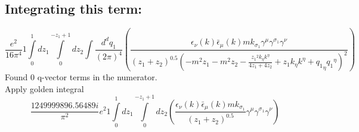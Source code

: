 \subsection*{Integrating this term:}
\begin{dmath}\frac{e^{2}}{16 \pi^{4}}1\int\limits_{ 0 }^{ 1 } d{ z_{ 1 } }\int\limits_{ 0 }^{ - { z_{ 1 } } + 1 } d{ z_{ 2 } }\int\frac{d^d q_1 }{ (2\pi)^4 }\left(\frac{\epsilon_{ \nu }({ k }) \bar{\epsilon}_{ \mu }({ k }) m { { k }_{ \sigma_1 } } { \gamma^{ \mu } } { \gamma^{ \sigma_1 } } { \gamma^{ \nu } }}{\left({ z_{ 1 } } + { z_{ 2 } }\right)^{0.5} \left(- m^{2} { z_{ 1 } } - m^{2} { z_{ 2 } } - \frac{{ z_{ 1 } }^{2} { { k }_{ \eta } } { { k }^{ \eta } }}{4 { z_{ 1 } } + 4 { z_{ 2 } }} + { z_{ 1 } } { { k }_{ \eta } } { { k }^{ \eta } } + { { q_1 }_{ \eta } } { { q_1 }^{ \eta } }\right)^{2}}\right)\end{dmath}
Found 0 q-vector terms in the numerator.\\
Apply golden integral
\begin{dmath}\frac{1249999896.56489 i}{\pi^{2}} e^{2}1\int\limits_{ 0 }^{ 1 } d{ z_{ 1 } }\int\limits_{ 0 }^{ - { z_{ 1 } } + 1 } d{ z_{ 2 } }\left(\frac{\epsilon_{ \nu }({ k }) \bar{\epsilon}_{ \mu }({ k }) m { { k }_{ \sigma_1 } }}{\left({ z_{ 1 } } + { z_{ 2 } }\right)^{0.5}} { \gamma^{ \mu } } { \gamma^{ \sigma_1 } } { \gamma^{ \nu } }\right)\end{dmath}

